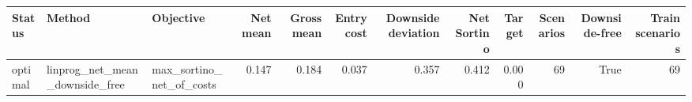 \begin{tabular}{lllrrrrrrrrr}
\toprule
Status & Method & Objective & Net mean & Gross mean & Entry cost & Downside deviation & Net Sortino & Target & Scenarios & Downside-free & Train scenarios \\
\midrule
optimal & linprog\_net\_mean\_downside\_free & max\_sortino\_net\_of\_costs & 0.147 & 0.184 & 0.037 & 0.357 & 0.412 & 0.000 & 69 & True & 69 \\
\bottomrule
\end{tabular}
